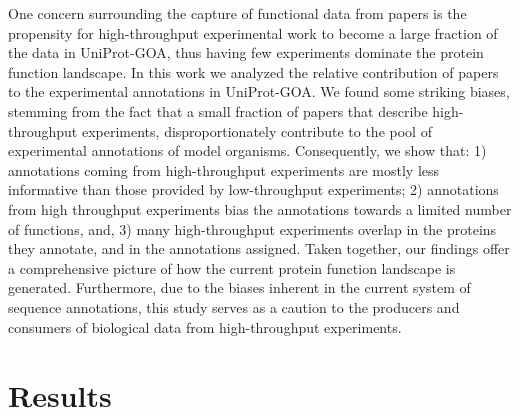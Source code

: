 \documentclass[12pt]{article}
\begin{document}
One concern surrounding the capture of functional data from papers is the propensity for
high-throughput experimental work to become a large fraction of the data in UniProt-GOA,
thus having few experiments dominate the protein function landscape. In this work we
analyzed the relative contribution of papers to the experimental annotations in UniProt-GOA.
We found some striking biases, stemming from the fact that a small fraction of papers that
describe high-throughput experiments, disproportionately contribute to the pool of
experimental annotations of model organisms. Consequently, we show that: 1) annotations
coming from high-throughput experiments are mostly less informative than those provided by
low-throughput experiments;  2) annotations from high throughput experiments bias the
annotations towards a limited number of functions, and, 3) many high-throughput experiments
overlap in the proteins they annotate, and in the annotations assigned. Taken together, our
findings offer a comprehensive picture of how the current protein function landscape is
generated. Furthermore, due to the biases inherent in the current system of sequence
annotations, this study serves as a caution to the producers and consumers of biological data
from high-throughput experiments. 


\section*{Results}
\end{document}

